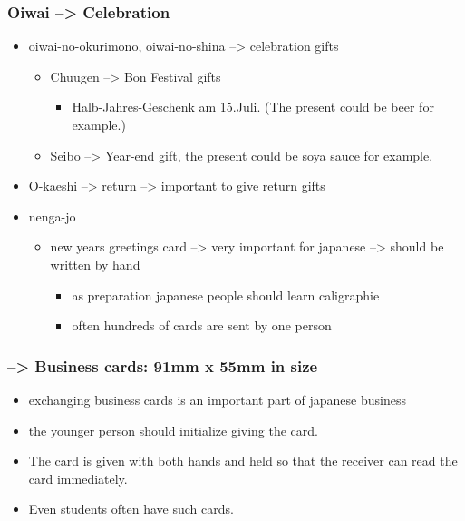 \documentclass{article}
\newcommand\tabni[1][0.2cm]{\hspace*{#1}}
\begin{document}
\subsubsection{ \tabni Oiwai --> Celebration}
\begin{itemize}%
\item oiwai-no-okurimono, oiwai-no-shina --> celebration gifts
\begin{itemize}%
\item {} \tabni Chuugen --> Bon Festival gifts
\begin{itemize}
\item Halb-Jahres-Geschenk am 15.Juli. (The present could be beer for example.)
\end{itemize}
\item {} \tabni Seibo
 --> Year-end gift, the present could be soya sauce for example.
\end{itemize}
\item {} O-kaeshi --> return --> important to give return gifts \\
\item {} nenga-jo
\begin{itemize}%
\item new years greetings card --> very important for japanese --> should be written by hand
\begin{itemize}
\item as preparation japanese people should learn caligraphie
\item often hundreds of cards are sent by one person \\
\end{itemize} 
\end{itemize}
\end{itemize}
\subsubsection{ --> Business cards: 91mm x 55mm in size}
\begin{itemize}%
\item exchanging business cards is an important part of japanese business
\item the younger person should initialize giving the card. 
\item The card is given with both hands and held so that the receiver can read the card immediately. 
\item Even students often have such cards. \\
\end{itemize}
\end{document}
